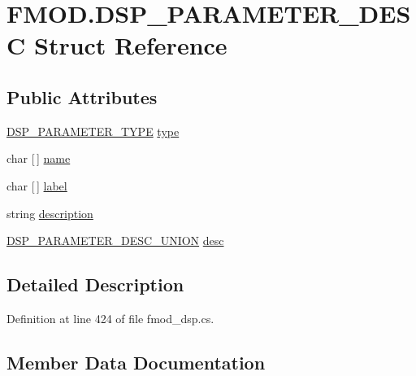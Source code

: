 \hypertarget{struct_f_m_o_d_1_1_d_s_p___p_a_r_a_m_e_t_e_r___d_e_s_c}{}\section{F\+M\+O\+D.\+D\+S\+P\+\_\+\+P\+A\+R\+A\+M\+E\+T\+E\+R\+\_\+\+D\+E\+SC Struct Reference}
\label{struct_f_m_o_d_1_1_d_s_p___p_a_r_a_m_e_t_e_r___d_e_s_c}
\subsection*{Public Attributes}
\begin{DoxyCompactItemize}
\item 
\hyperlink{namespace_f_m_o_d_a294ea0e9a51b5afad5638478a72aa712}{D\+S\+P\+\_\+\+P\+A\+R\+A\+M\+E\+T\+E\+R\+\_\+\+T\+Y\+PE} \hyperlink{struct_f_m_o_d_1_1_d_s_p___p_a_r_a_m_e_t_e_r___d_e_s_c_a9cc9c261b69a8e9873718bf0c4428a25}{type}
\item 
char \mbox{[}$\,$\mbox{]} \hyperlink{struct_f_m_o_d_1_1_d_s_p___p_a_r_a_m_e_t_e_r___d_e_s_c_ab382734b4b790a1a891a03fbb1826f5b}{name}
\item 
char \mbox{[}$\,$\mbox{]} \hyperlink{struct_f_m_o_d_1_1_d_s_p___p_a_r_a_m_e_t_e_r___d_e_s_c_a88c654f8d372c1835e788192d5f0f8d3}{label}
\item 
string \hyperlink{struct_f_m_o_d_1_1_d_s_p___p_a_r_a_m_e_t_e_r___d_e_s_c_a443ff2f886803eda6e1eacf002570c95}{description}
\item 
\hyperlink{struct_f_m_o_d_1_1_d_s_p___p_a_r_a_m_e_t_e_r___d_e_s_c___u_n_i_o_n}{D\+S\+P\+\_\+\+P\+A\+R\+A\+M\+E\+T\+E\+R\+\_\+\+D\+E\+S\+C\+\_\+\+U\+N\+I\+ON} \hyperlink{struct_f_m_o_d_1_1_d_s_p___p_a_r_a_m_e_t_e_r___d_e_s_c_ab97f09650fe774d81979f4a8752e0c82}{desc}
\end{DoxyCompactItemize}


\subsection{Detailed Description}


Definition at line 424 of file fmod\+\_\+dsp.\+cs.



\subsection{Member Data Documentation}
\mbox{\label{struct_f_m_o_d_1_1_d_s_p___p_a_r_a_m_e_t_e_r___d_e_s_c_ab97f09650fe774d81979f4a8752e0c82}} 
